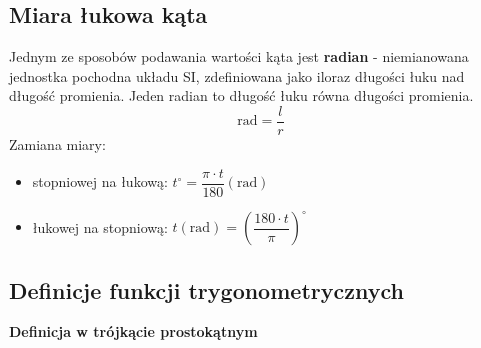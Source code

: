 \documentclass[14pt,a4paper]{extarticle}
\begin{document}
\subsection{Miara łukowa kąta}
\noindent Jednym ze sposobów podawania wartości kąta jest \textbf{radian} - niemianowana jednostka
pochodna układu SI, zdefiniowana jako iloraz długości łuku nad długość promienia. Jeden radian to
długość łuku równa długości promienia.\\
$$\text{rad} = \dfrac{l}{r}$$\hfill\break
Zamiana miary:
\begin{itemize}
   \item stopniowej na łukową: $t^{\circ } = \dfrac{\pi \cdot t}{180} (\text{rad})$
   \item łukowej na stopniową: $t(\text{rad}) = \left(\dfrac{180 \cdot t}{\pi}\right)^{\circ}$
\end{itemize}
\subsection{Definicje funkcji trygonometrycznych}
\noindent\textbf{Definicja w trójkącie prostokątnym}
\end{document}
